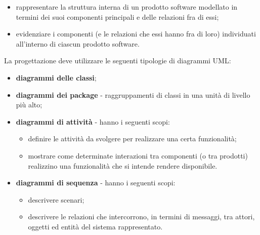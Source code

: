 \begin{itemize}
			\begin{itemize}
				\item rappresentare la struttura interna di un prodotto software modellato in termini dei suoi componenti principali e delle relazioni fra di essi;
				\item evidenziare i componenti (e le relazioni che essi hanno fra di loro)
individuati all'interno di ciascun prodotto software.
			\end{itemize}
			La progettazione deve utilizzare le seguenti tipologie di diagrammi UML:
			\begin{itemize}
				\item \textbf{diagrammi delle classi};
				\item \textbf{diagrammi dei package} - raggruppamenti di classi in una unità di livello più alto;
				\item \textbf{diagrammi di attività} - hanno i seguenti scopi:
					\begin{itemize}
						\item definire le attività da svolgere per realizzare una certa funzionalità;
						\item mostrare come determinate interazioni tra componenti (o tra prodotti) realizzino una funzionalità che si intende rendere disponibile.
					\end{itemize}
				\item \textbf{diagrammi di sequenza} - hanno i seguenti scopi:		
					\begin{itemize}
						\item descrivere scenari;	
						\item descrivere le relazioni che intercorrono, in termini di messaggi, tra attori, oggetti ed entità del sistema rappresentato.
					\end{itemize}						
			\end{itemize}
			\end{itemize}
